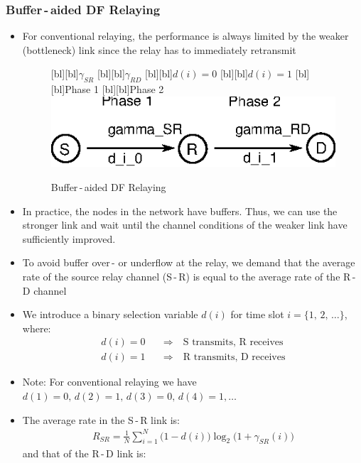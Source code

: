 \documentclass[a4paper, 10pt]{article}
\begin{document}
\subsubsection{Buffer\,-\,aided DF Relaying}
\begin{itemize}
	\item For conventional relaying, the performance is always limited by the weaker (bottleneck) link since the relay has to immediately retransmit
	\begin{figure}[ht]
		\centering
		[bl][bl]{$\gamma_{SR}$}
		[bl][bl]{$\gamma_{RD}$}
		[bl][bl]{$d(i) = 0$}
		[bl][bl]{$d(i) = 1$}
		[bl][bl]{Phase 1}
		[bl][bl]{Phase 2}
		\includegraphics[scale=1.4]{Buffer_Aided_DF_Relaying}
		\caption{Buffer\,-\,aided DF Relaying}
		\label{fig:Buffer_Aided_DF_Relaying}
	\end{figure}
	\item In practice, the nodes in the network have buffers. Thus, we can use the stronger link and wait until the channel conditions of the weaker link have sufficiently improved.
	\item To avoid buffer over\,- or underflow at the relay, we demand that the average rate of the source relay channel (S\,-\,R) is equal to the average rate of the R\,-\,D channel
	\item We introduce a binary selection variable $d(i) $ for time slot $i = \{1,\,2,\,\ldots\} $, where:
	\begin{align*}
		d(i) = 0 \quad &\Rightarrow \quad \text{S transmits, R receives} \\
		d(i) = 1 \quad &\Rightarrow \quad \text{R transmits, D receives}
	\end{align*}
	\item Note: For conventional relaying we have $ d(1) = 0,\, d(2) = 1,\, d(3) = 0,\, d(4) = 1, \ldots $
	\item The average rate in the S\,-\,R link is:
	\begin{align*}
		R_{SR} = \frac{1}{N}\sum_{i=1}^{N}\bigl(1 - d(i)\bigr)\log_2\bigl(1 + \gamma_{SR}(i)\bigr)
	\end{align*}
	and that of the R\,-\,D link is:

\end{itemize}
\end{document}
